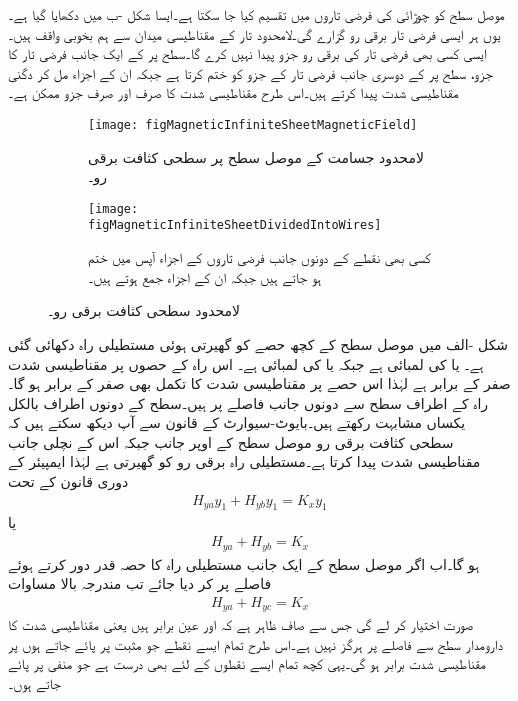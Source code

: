 موصل سطح کو  چوڑائی کی فرضی تاروں میں تقسیم کیا جا سکتا ہے۔ایسا شکل -ب میں دکھایا گیا ہے۔یوں ہر ایسی فرضی تار  برقی رو گزارے گی۔لامحدود تار کے مقناطیسی میدان سے ہم بخوبی واقف ہیں۔ایسی کسی بھی فرضی تار کی برقی رو  جزو پیدا نہیں کرے گا۔سطح پر  کے ایک جانب فرضی تار کا  جزو، سطح پر  کے دوسری جانب فرضی تار کے  جزو کو ختم کرتا ہے جبکہ ان  کے  اجزاء مل کر دگنی مقناطیسی شدت پیدا کرتے ہیں۔اس طرح مقناطیسی شدت کا صرف اور صرف  جزو ممکن ہے۔

\begin{figure}
\centering
\begin{subfigure}{0.5\textwidth}
\centering
\texttt{[image: figMagneticInfiniteSheetMagneticField]}
\caption{لامحدود جسامت کے موصل سطح پر سطحی کثافت برقی رو۔}
\label{شکل_مقناطیسی_لامحدود_سطحی_برقی_رو}
\end{subfigure}%
%
\begin{subfigure}{0.5\textwidth}
\centering
\texttt{[image: figMagneticInfiniteSheetDividedIntoWires]}
\caption{کسی بھی نقطے کے دونوں جانب فرضی تاروں کے  اجزاء آپس میں ختم ہو جاتے ہیں جبکہ ان کے  اجزاء جمع ہوتے ہیں۔}
\label{شکل_مقناطیسی_دونوں_جانب_زیڈ_اجزاء_ختم}
\end{subfigure}%
\caption{لامحدود سطحی کثافت برقی رو۔}
\label{شکل_مقناطیسی_لامحدود_سطحی_کثافت_برقی_رو}
\end{figure}
شکل -الف میں موصل سطح کے کچھ حصے کو گھیرتی ہوئی مستطیلی راہ  دکھائی گئی ہے۔ یا  کی لمبائی  ہے جبکہ  یا  کی لمبائی  ہے۔ اس راہ کے  حصوں پر مقناطیسی شدت صفر کے برابر ہے لہٰذا اس حصے پر مقناطیسی شدت کا تکمل بھی صفر کے برابر ہو گا۔راہ کے  اطراف سطح سے دونوں جانب  فاصلے پر ہیں۔سطح کے دونوں اطراف بالکل یکساں مشابہت رکھتے ہیں۔بایوٹ-سیوارٹ کے قانون سے آپ دیکھ سکتے ہیں کہ سطحی کثافت برقی رو  موصل سطح کے اوپر جانب  جبکہ اس کے نچلی جانب   مقناطیسی شدت پیدا کرتا ہے۔مستطیلی راہ  برقی رو کو گھیرتی ہے لہٰذا ایمپیئر کے دوری قانون کے تحت
\begin{align*}
H_{ya} y_1+H_{yb} y_1=K_x y_1
\end{align*} 
یا
\begin{align}\label{مساوات_مقناطیسی_لامحدود_دونوں_اطراف}
H_{ya} +H_{yb}=K_x
\end{align} 
ہو گا۔اب اگر موصل سطح کے ایک جانب مستطیلی راہ کا  حصہ قدر دور کرتے ہوئے  فاصلے پر کر دیا جائے تب مندرجہ بالا مساوات 
\begin{align*}
H_{ya} +H_{yc}=K_x
\end{align*} 
صورت اختیار کر لے گی جس سے صاف ظاہر ہے کہ  اور  عین برابر ہیں یعنی مقناطیسی شدت کا دارومدار سطح سے فاصلے پر ہرگز نہیں ہے۔اس طرح تمام ایسے نقطے جو مثبت  پر پائے جاتے ہوں پر مقناطیسی شدت برابر ہو گی۔یہی کچھ تمام ایسے نقطوں کے لئے بھی درست ہے جو منفی  پر پائے جاتے ہوں۔ 


